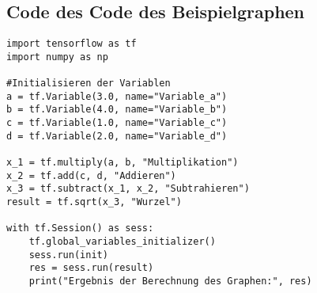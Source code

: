 \subsection{Code des Code des Beispielgraphen}
\label{sec:codeBeispielGraph}
\begin{lstlisting}
import tensorflow as tf
import numpy as np

#Initialisieren der Variablen
a = tf.Variable(3.0, name="Variable_a")
b = tf.Variable(4.0, name="Variable_b")
c = tf.Variable(1.0, name="Variable_c")
d = tf.Variable(2.0, name="Variable_d")

x_1 = tf.multiply(a, b, "Multiplikation")
x_2 = tf.add(c, d, "Addieren")
x_3 = tf.subtract(x_1, x_2, "Subtrahieren")
result = tf.sqrt(x_3, "Wurzel")

with tf.Session() as sess:
    tf.global_variables_initializer()
    sess.run(init)
    res = sess.run(result)
    print("Ergebnis der Berechnung des Graphen:", res)
    
\end{lstlisting}